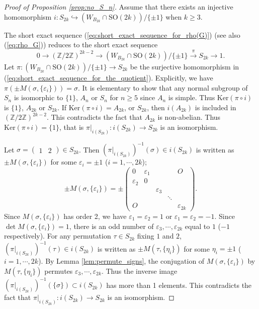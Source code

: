 \documentclass{amsart}
\theoremstyle{definition}
\theoremstyle{remark}
\numberwithin{equation}{section}
\begin{document}
\begin{proof}[Proof of Proposition \ref{prop:no_S_n}]
Assume that there exists an injective homomorphism 
$i : S_{2k} \hookrightarrow (W_{B_{2k}} \cap \mathrm{SO}(2k))  / \{ \pm 1 \}$ 
when $k \geq 3$.

The short exact sequence (\ref{eq:short_exact_sequence_for_rho(G)}) 
(see also (\ref{eq:rho_G})) reduces to the short exact sequence
\begin{equation}
\label{eq:short_exact_sequence_for_the_quotient}
0 \to (\mathbb{Z} / 2 \mathbb{Z})^{2k-2} \to 
(W_{B_{2k}} \cap \mathrm{SO}(2k))/\{ \pm 1 \} \xrightarrow[]{\pi} S_{2k} \to 1.
\end{equation}
Let $\pi : (W_{B_{2k}} \cap \mathrm{SO}(2k))  / \{ \pm 1 \} \to S_{2k}$ be the
surjective homomorphism in (\ref{eq:short_exact_sequence_for_the_quotient}).
Explicitly, we have $\pi( \pm M(\sigma, \{ \varepsilon_i \})) = \sigma$.
It is elementary to show that any normal subgroup of $S_n$ is isomorphic to 
$\{1\}$, $A_n$ or $S_n$ for $n \geq 5$ since $A_n$ is simple.
Thus $\mathrm{Ker} (\pi \circ i)$ is $\{1\}$, $A_{2k}$ or $S_{2k}$.
If $\mathrm{Ker} (\pi \circ i) = A_{2k}$, or $S_{2k}$, 
then $i(A_{2k})$ is included in $(\mathbb{Z} / 2 \mathbb{Z})^{2k-2}$.
This contradicts the fact that $A_{2k}$ is non-abelian.
Thus $\mathrm{Ker} (\pi \circ i) = \{ 1 \}$, 
that is $\pi |_{i(S_{2k})} : i(S_{2k}) \to S_{2k}$ is an isomorphism.

Let $\sigma = \begin{pmatrix} 1 & 2 \end{pmatrix} \in S_{2k}$.
Then $(\pi |_{i(S_{2k})})^{-1} ( \sigma ) \in i (S_{2k})$ is  written as 
$\pm M(\sigma, \{ \varepsilon_i \})$ 
for some $\varepsilon_i = \pm 1$ ($i = 1, \cdots , 2k$);
\[
\pm M(\sigma, \{ \varepsilon_i \}) 
= \pm
\begin{pmatrix} 
0 & \varepsilon_1 & & & O \\
\varepsilon_2 & 0 & & &  \\
& & \varepsilon_{3}& & \\
& & & \ddots \\
O & & & &\varepsilon_{2k}
\end{pmatrix}.
\]
Since $M(\sigma, \{ \varepsilon_i \})$ has order 2, 
we have $\varepsilon_1 = \varepsilon_2 = 1$ or $\varepsilon_1 = \varepsilon_2 = -1$. 
Since $\det M(\sigma, \{ \varepsilon_i \}) = 1$, 
there is an odd number of $\varepsilon_3, \cdots , \varepsilon_{2k}$ equal to $1$
($-1$ respectively).
For any permutation $\tau \in S_{2k}$ fixing $1$ and $2$, 
$(\pi |_{i(S_{2k})})^{-1} ( \tau ) \in i (S_{2k})$ is  written as 
$\pm M(\tau, \{ \eta_i \})$ 
for some $\eta_i = \pm 1$ ($i = 1, \cdots , 2k$).
By Lemma \ref{lem:permute_signs}, 
the conjugation of $M(\sigma, \{ \varepsilon_i \})$ by $M(\tau, \{ \eta_i \})$ 
permutes $\varepsilon_3, \cdots , \varepsilon_{2k}$.
Thus the inverse image $(\pi |_{i(S_{2k})})^{-1} ( \{ \sigma \} ) \subset  i (S_{2k})$
has more than 1 elements. 
This contradicts the fact that 
$\pi |_{i(S_{2k})} : i(S_{2k}) \to S_{2k}$ is an isomorphism.
\end{proof}
\end{document}
